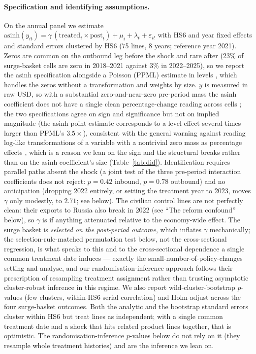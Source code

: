 \documentclass[12pt]{article}
\begin{document}
\paragraph{Specification and identifying assumptions.} On the annual panel we estimate
$\text{asinh}(y_{it}) = \gamma\,(\text{treated}_i \times \text{post}_t) + \mu_i + \lambda_t +
\varepsilon_{it}$ with HS6 and year fixed effects and standard errors clustered by HS6 (75
lines, 8 years; reference year 2021). Zeros are common on the outbound leg before the shock
and rare after (23\% of surge-basket cells are zero in 2018--2021 against 3\% in 2022--2025), so
we report the asinh specification alongside a Poisson (PPML) estimate in levels
\citep{silvatenreyro2006}, which handles
the zeros without a transformation and weights by size. $y$ is measured in raw USD, so with a
substantial zero-and-near-zero pre-period mass the asinh coefficient does not have a single
clean percentage-change reading across cells \citep{bellemarewichman2020}; the two specifications agree on sign and
significance but not on implied magnitude (the asinh point estimate corresponds to a level
effect several times larger than PPML's $3.5\times$), consistent with the general warning
against reading log-like transformations of a variable with a nontrivial zero mass as
percentage effects \citep{chenroth2024}, which is a reason we lean on the sign and
the structural breaks rather than on the asinh coefficient's size (Table~\ref{tab:did}).
Identification requires parallel paths absent the shock
(a joint test of the three pre-period interaction coefficients does not reject: $p = 0.42$
inbound, $p = 0.78$ outbound) and no anticipation (dropping 2022 entirely, or setting the
treatment year to 2023, moves $\gamma$ only modestly, to $2.71$; see below). The civilian
control lines are not perfectly clean: their exports to Russia also break in 2022
(see ``The reform confound'' below), so $\gamma$ is if anything attenuated relative to the
economy-wide effect. The surge basket is \emph{selected on the post-period outcome}, which inflates $\gamma$
mechanically; the selection-rule-matched permutation test below, not the cross-sectional
regression, is what speaks to this and to the cross-sectional dependence a single common
treatment date induces --- exactly the small-number-of-policy-changes setting
\citet{conleytaber2011} and \citet{fermanpinto2019} analyse, and our randomisation-inference
approach follows their prescription of resampling treatment assignment rather than trusting
asymptotic cluster-robust inference in this regime. We also report wild-cluster-bootstrap
$p$-values \citep{cameronbellermillergelbach2008} (few clusters,
within-HS6 serial correlation) and Holm-adjust across the four surge-basket outcomes. Both the
analytic and the bootstrap standard errors cluster within HS6 but treat lines as independent;
with a single common treatment date and a shock that hits related product lines together, that
is optimistic. The randomisation-inference $p$-values below do not rely on it (they resample
whole treatment histories) and are the inference we lean on.
\end{document}
